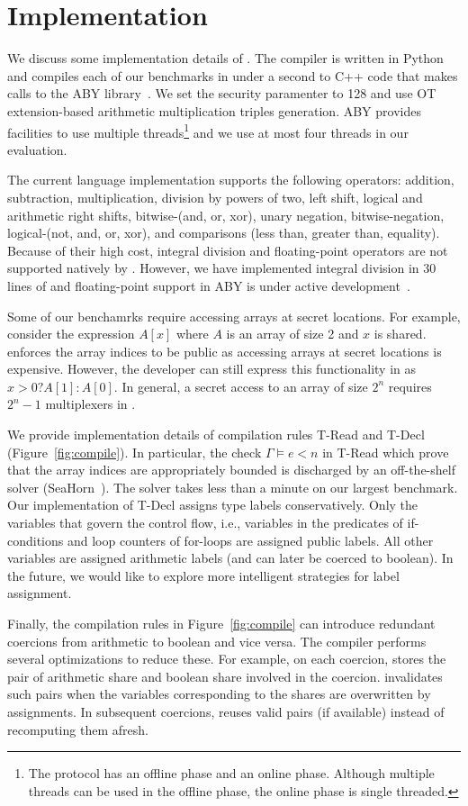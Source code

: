 \section{Implementation}
\label{sec:impl}
We discuss some  implementation details of \tool.
The  \tool compiler is written in Python and
compiles each of our benchmarks in under a second to C++ code that makes calls to the ABY
library~\cite{aby}. We set the security paramenter to 128 and use OT extension-based arithmetic multiplication triples generation. ABY provides facilities to use multiple threads\footnote{The protocol has an offline phase and an online phase. Although multiple threads can be used in the offline phase, the online phase is single threaded.} and we use at most four threads in our evaluation.

The current language implementation supports the following operators:
addition, subtraction, multiplication, division by powers of two, left shift,
logical and arithmetic right shifts, bitwise-(and, or, xor), unary negation,
bitwise-negation, logical-(not, and, or, xor), and comparisons (less than, greater than, equality).
Because of their high cost, integral division and floating-point operators are not supported natively by \tool.
However, we have implemented integral division in 30 lines of \tool and floating-point support in
ABY is under active development~\cite{ddkssz15}.


Some of our benchamrks require accessing arrays at secret locations.
For example, consider the expression $A[x]$ where $A$ is an array of size 2 and $x$ is shared.
\tool enforces the array indices to be public as accessing arrays at secret locations is expensive.
However, the developer can still express this functionality in \tool
as $x > 0 ? A[1] : A[0]$. In general, a secret access to an array of size $2^n$ requires $2^{n}-1$ multiplexers in \tool.



We provide implementation details of compilation rules {\sc T-Read} and {\sc T-Decl} (Figure~\ref{fig:compile}).
In particular, the check $\Gamma\vDash e < n$ in {\sc T-Read}
which prove that the array indices are appropriately bounded
is discharged by an off-the-shelf solver (SeaHorn~\cite{seahorn}).
The solver takes less than a minute on our largest benchmark.
Our implementation of {\sc T-Decl} assigns type labels conservatively.
Only the variables that govern the control flow, i.e., variables
in the predicates of if-conditions and loop counters of for-loops are assigned public labels.
All other variables are  assigned arithmetic labels (and can later be coerced to boolean).
In the future, we would like to explore more intelligent strategies for label assignment.


Finally, the compilation rules in Figure~\ref{fig:compile} can introduce redundant coercions from arithmetic to
boolean  and vice versa.
The  compiler performs several optimizations to reduce these.
For example, on each coercion, \tool stores the pair of arithmetic share and boolean share involved in the coercion.
\tool invalidates such pairs when the variables corresponding to the shares are overwritten by assignments.
In subsequent coercions, \tool  reuses valid pairs (if available) instead of recomputing them afresh. 
